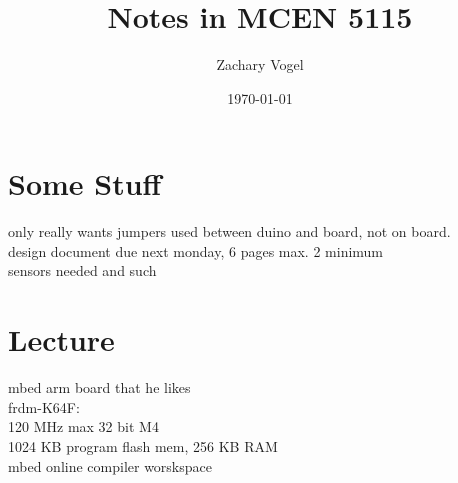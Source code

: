 \documentclass{article}
\author{Zachary Vogel}
\date{\today}
\title{Notes in MCEN 5115}
\begin{document}
\maketitle


\section*{Some Stuff}
only really wants jumpers used between duino and board, not on board.\\
design document due next monday, 6 pages max. 2 minimum\\
sensors needed and such\\

\section*{Lecture}
mbed arm board that he likes\\
frdm-K64F:\\
120 MHz max 32 bit M4\\
1024 KB program flash mem, 256 KB RAM\\


mbed online compiler worskspace\\
\end{document}
